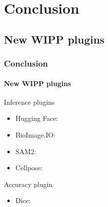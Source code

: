 \def\sectiontitle{Conclusion}

\section{\sectiontitle}

\def\slidetitle{New WIPP plugins}

\subsection{\slidetitle}
\begin{frame}
  \frametitle{\sectiontitle}
  \framesubtitle{\slidetitle}

  Inference plugins
  \begin{itemize}
    \item Hugging Face:
    \item BioImage.IO:
    \item SAM2: 
    \item Cellpose: 
  \end{itemize}

  Accuracy plugin
  \begin{itemize}
    \item Dice: 
  \end{itemize}

\end{frame}

\def\slidetitle{Fine-tuning plugin}

